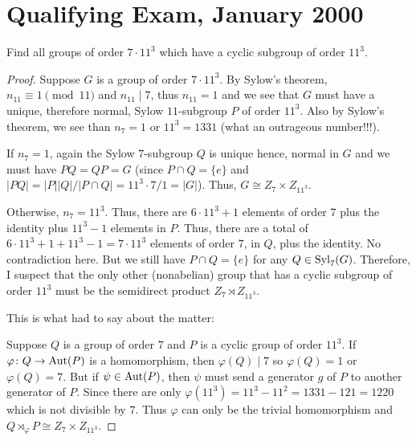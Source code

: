 \chapter{Qualifying Exam, January 2000}
\begin{problem}
Find all groups of order $7\cdot 11^3$ which have a cyclic subgroup of
order $11^3$.
\end{problem}
\begin{proof}
Suppose $G$ is a group of order $7\cdot 11^3$. By Sylow's theorem,
$n_{11}\equiv 1\pmod{11}$ and $n_{11}\mid 7$, thus $n_{11}=1$ and we see
that $G$ must have a unique, therefore normal, Sylow $11$-subgroup $P$ of
order $11^3$. Also by Sylow's theorem, we see than $n_7=1$ or $11^3=1331$
(what an outrageous number!!!).

If $n_7=1$, again the Sylow $7$-subgroup $Q$ is unique hence, normal in $G$
and we must have $PQ=QP=G$ (since $P\cap Q=\{e\}$ and
$|PQ|=|P||Q|/|P\cap Q|=11^3\cdot 7/1=|G|$). Thus,
$G\cong Z_7\times Z_{11^3}$.

Otherwise, $n_7=11^3$. Thus, there are $6\cdot 11^3+1$ elements of order
$7$ plus the identity plus $11^3-1$ elements in $P$. Thus, there are a
total of $6\cdot 11^3+1+11^3-1=7\cdot 11^3$ elements of order $7$, in $Q$,
plus the identity. No contradiction here. But we still have $P\cap Q=\{e\}$
for any $Q\in\operatorname{Syl}_7(G)$. Therefore, I suspect that the only other
(nonabelian) group that has a cyclic subgroup of order $11^3$ must be the
semidirect product $Z_7\rtimes Z_{11^3}$.

This is what  had to say about the matter:

Suppose $Q$ is a group of order $7$ and $P$ is a cyclic group of order
$11^3$. If $\varphi\colon Q\to\operatorname{Aut}(P)$ is a homomorphism, then
$\varphi(Q)\mid 7$ so $\varphi(Q)=1$ or $\varphi(Q)=7$. But if
$\psi\in\operatorname{Aut}(P)$, then $\psi$ must send a generator $g$ of $P$ to another
generator of $P$. Since there are only
$\varphi(11^3)=11^3-11^2=1331-121=1220$ which is not divisible by $7$. Thus
$\varphi$ can only be the trivial homomorphism and $Q\rtimes_\varphi P\cong
Z_7\times Z_{11^3}$.
\end{proof}

